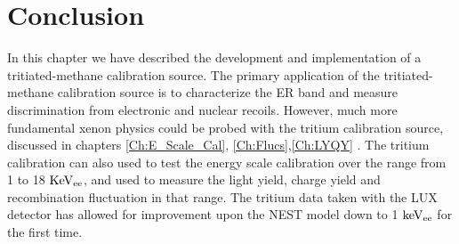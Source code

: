 \section{Conclusion}

In this chapter we have described the development and implementation of a tritiated-methane calibration source. The primary application of the tritiated-methane calibration source is to characterize the ER band and measure discrimination from electronic and nuclear recoils. However, much more fundamental xenon physics could be probed with the tritium calibration source, discussed in chapters \ref{Ch:E_Scale_Cal}, \ref{Ch:Flucs},\ref{Ch:LYQY} . 
The tritium calibration can also used to test the energy scale calibration over the range from 1 to 18 $\rm KeV_{ee}$, and used to measure the light yield, charge yield and recombination fluctuation in that range. The tritium data taken with the LUX detector has allowed for improvement upon the NEST model down to 1 $\rm keV_{ee}$ for the first time. 


